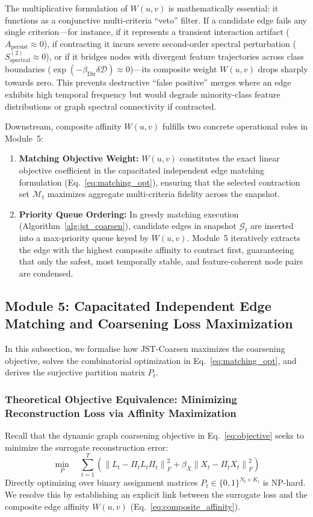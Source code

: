 \documentclass[sigconf]{acmart}
\begin{document}
The multiplicative formulation of $W(u, v)$ is mathematically essential: it functions as a conjunctive multi-criteria ``veto'' filter. If a candidate edge fails any single criterion---for instance, if it represents a transient interaction artifact ($A_{\text{persist}} \approx 0$), if contracting it incurs severe second-order spectral perturbation ($S_{\text{spectral}}^{(2)} \approx 0$), or if it bridges nodes with divergent feature trajectories across class boundaries ($\exp(-\beta_{\text{Dir}} \delta \mathcal{D}) \approx 0$)---its composite weight $W(u, v)$ drops sharply towards zero. This prevents destructive ``false positive'' merges where an edge exhibits high temporal frequency but would degrade minority-class feature distributions or graph spectral connectivity if contracted.

Downstream, composite affinity $W(u, v)$ fulfills two concrete operational roles in Module~5:
\begin{enumerate}
    \item \textbf{Matching Objective Weight:} $W(u, v)$ constitutes the exact linear objective coefficient in the capacitated independent edge matching formulation (Eq.~\eqref{eq:matching_opt}), ensuring that the selected contraction set $\mathcal{M}_t$ maximizes aggregate multi-criteria fidelity across the snapshot.
    \item \textbf{Priority Queue Ordering:} In greedy matching execution (Algorithm~\ref{alg:jst_coarsen}), candidate edges in snapshot $\mathcal{G}_t$ are inserted into a max-priority queue keyed by $W(u, v)$. Module~5 iteratively extracts the edge with the highest composite affinity to contract first, guaranteeing that only the safest, most temporally stable, and feature-coherent node pairs are condensed.
\end{enumerate}

\subsection{Module 5: Capacitated Independent Edge Matching and Coarsening Loss Maximization}
\label{sec:module5}
In this subsection, we formalise how JST-Coarsen maximizes the coarsening objective, solves the combinatorial optimization in Eq.~\eqref{eq:matching_opt}, and derives the surjective partition matrix $P_t$.

\subsubsection{Theoretical Objective Equivalence: Minimizing Reconstruction Loss via Affinity Maximization}
Recall that the dynamic graph coarsening objective in Eq.~\eqref{eq:objective} seeks to minimize the surrogate reconstruction error:
\begin{equation*}
\min_{P} \quad \sum_{t=1}^T \left( \left\| L_t - \Pi_t L_t \Pi_t \right\|_F^2 + \beta_X \left\| X_t - \Pi_t X_t \right\|_F^2 \right)
\end{equation*}
Directly optimizing over binary assignment matrices $P_t \in \{0, 1\}^{N_t \times K_t}$ is NP-hard. We resolve this by establishing an explicit link between the surrogate loss and the composite edge affinity $W(u, v)$ (Eq.~\eqref{eq:composite_affinity}). 
\end{document}
